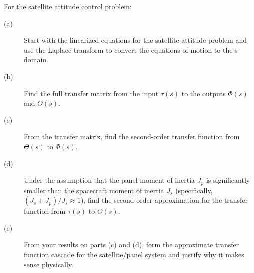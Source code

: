 For the satellite attitude control problem:
  \begin{description}
    \item[(a)] Start with the linearized equations for the satellite attitude problem and use the Laplace transform to convert the equations of motion to the s-domain.
    \item[(b)] Find the full transfer matrix from the input $\tau(s)$ to the outputs $\Phi(s)$ and $\Theta(s)$.
	\item[(c)] From the transfer matrix, find the second-order transfer function from $\Theta(s)$ to $\Phi(s)$.
	\item[(d)] Under the assumption that the panel moment of inertia $J_p$ is significantly smaller than the spacecraft moment of inertia $J_s$ (specifically, $(J_s+J_p)/J_s \approx 1$), find the second-order approximation for the transfer function from $\tau(s)$ to $\Theta(s)$.
	\item[(e)] From your results on parts (c) and (d), form the approximate transfer function cascade for the satellite/panel system and justify why it makes sense physically.
  \end{description}
